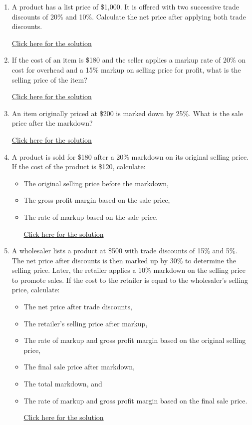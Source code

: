 \documentclass[
]{book}
\providecommand{\tightlist}{%
  \setlength{\itemsep}{0pt}\setlength{\parskip}{0pt}}
\begin{document}
\begin{enumerate}
\def\labelenumi{\arabic{enumi}.}
\tightlist
\item
  A product has a list price of \$1,000. It is offered with two successive trade discounts of 20\% and 10\%. Calculate the net price after applying both trade discounts.

  \href{https://youtu.be/RYQOeGDUyv0}{Click here for the solution}
\item
  If the cost of an item is \$180 and the seller applies a markup rate of 20\% on cost for overhead and a 15\% markup on selling price for profit, what is the selling price of the item?

  \href{https://youtu.be/8D4lgsp54FI}{Click here for the solution}
\item
  An item originally priced at \$200 is marked down by 25\%. What is the sale price after the markdown?

  \href{https://youtu.be/6aA6vWWjNCM}{Click here for the solution}
\item
  A product is sold for \$180 after a 20\% markdown on its original selling price. If the cost of the product is \$120, calculate:

  \begin{itemize}
  \tightlist
  \item
    The original selling price before the markdown,
  \item
    The gross profit margin based on the sale price,
  \item
    The rate of markup based on the sale price.

    \href{https://youtu.be/W7gbRh4Z1YQ}{Click here for the solution}
  \end{itemize}
\item
  A wholesaler lists a product at \$500 with trade discounts of 15\% and 5\%. The net price after discounts is then marked up by 30\% to determine the selling price. Later, the retailer applies a 10\% markdown on the selling price to promote sales. If the cost to the retailer is equal to the wholesaler's selling price, calculate:

  \begin{itemize}
  \tightlist
  \item
    The net price after trade discounts,
  \item
    The retailer's selling price after markup,
  \item
    The rate of markup and gross profit margin based on the original selling price,
  \item
    The final sale price after markdown,
  \item
    The total markdown, and
  \item
    The rate of markup and gross profit margin based on the final sale price.

    \href{https://youtu.be/03v9Et4Do5w}{Click here for the solution}
  \end{itemize}
\end{enumerate}
\end{document}
